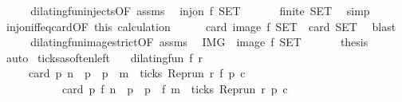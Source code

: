 \begin{isabellebody}
%
\isadelimproof
%
\endisadelimproof
%
\isatagproof
{}\isamarkupfalse%
\ {\isacharminus}\isanewline
\ \ \isamarkupfalse%
\ dilating{\isacharunderscore}fun{\isacharunderscore}injects{\isacharbrackleft}OF\ assms{\isacharbrackright}\ \isamarkupfalse%
\ {\isacartoucheopen}inj{\isacharunderscore}on\ f\ {\isacharquery}SET{\isacartoucheclose}\ \isacommand{{\isachardot}}\isamarkupfalse%
\isanewline
\ \ \isamarkupfalse%
\ \isamarkupfalse%
\ {\isacartoucheopen}finite\ {\isacharquery}SET{\isacartoucheclose}\ \isamarkupfalse%
\ simp\isanewline
\ \ \isamarkupfalse%
\ inj{\isacharunderscore}on{\isacharunderscore}iff{\isacharunderscore}eq{\isacharunderscore}card{\isacharbrackleft}OF\ this{\isacharbrackright}\ calculation\isanewline
\ \ \ \ \isamarkupfalse%
\ {\isacartoucheopen}card\ {\isacharparenleft}image\ f\ {\isacharquery}SET{\isacharparenright}\ {\isacharequal}\ card\ {\isacharquery}SET{\isacartoucheclose}\ \isamarkupfalse%
\ blast\isanewline
\ \ \isamarkupfalse%
\ \isamarkupfalse%
\ dilating{\isacharunderscore}fun{\isacharunderscore}image{\isacharunderscore}strict{\isacharbrackleft}OF\ assms{\isacharbrackright}\ \isamarkupfalse%
\ {\isacartoucheopen}{\isacharquery}IMG\ {\isacharequal}\ image\ f\ {\isacharquery}SET{\isacartoucheclose}\ \isacommand{{\isachardot}}\isamarkupfalse%
\isanewline
\ \ \isamarkupfalse%
\ \isamarkupfalse%
\ {\isacharquery}thesis\ \isamarkupfalse%
\ auto\isanewline
{}\isamarkupfalse%
%
\endisatagproof
{\isafoldproof}%
%
\isadelimproof
\isanewline
%
\endisadelimproof
\isanewline
{}\isamarkupfalse%
\ ticks{\isacharunderscore}as{\isacharunderscore}often{\isacharunderscore}left{\isacharcolon}\isanewline
\ \ \ {\isacartoucheopen}dilating{\isacharunderscore}fun\ f\ r{\isacartoucheclose}\isanewline
\ \ \ \ \ {\isacartoucheopen}card\ {\isacharbraceleft}p{\isachardot}\ n\ {\isasymle}\ p\ {\isasymand}\ p\ {\isacharless}\ m\ {\isasymand}\ ticks\ {\isacharparenleft}{\isacharparenleft}Rep{\isacharunderscore}run\ r{\isacharparenright}\ {\isacharparenleft}f\ p{\isacharparenright}\ c{\isacharparenright}{\isacharbraceright}\isanewline
\ \ \ \ \ \ \ \ \ \ {\isacharequal}\ card\ {\isacharbraceleft}p{\isachardot}\ f\ n\ {\isasymle}\ p\ {\isasymand}\ p\ {\isacharless}\ f\ m\ {\isasymand}\ ticks\ {\isacharparenleft}{\isacharparenleft}Rep{\isacharunderscore}run\ r{\isacharparenright}\ p\ c{\isacharparenright}{\isacharbraceright}{\isacartoucheclose}\isanewline

\end{isabellebody}
